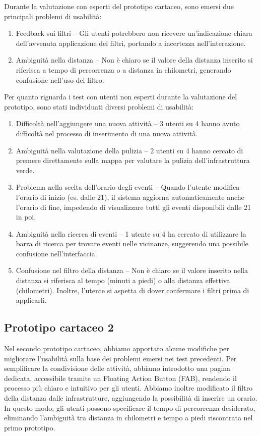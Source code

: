 Durante la valutazione con esperti del prototipo cartaceo, sono emersi due principali problemi di usabilità:
\begin{enumerate}
    \item Feedback sui filtri – Gli utenti potrebbero non ricevere un’indicazione chiara dell'avvenuta applicazione dei filtri, portando a incertezza nell’interazione.
    \item Ambiguità nella distanza – Non è chiaro se il valore della distanza inserito si riferisca a tempo di percorrenza o a distanza in chilometri, generando confusione nell’uso del filtro.
\end{enumerate}
Per quanto riguarda i test con utenti non esperti durante la valutazione del prototipo, sono stati individuati diversi problemi di usabilità:
\begin{enumerate}
    \item Difficoltà nell’aggiungere una nuova attività – 3 utenti su 4 hanno avuto difficoltà nel processo di inserimento di una nuova attività.
    \item Ambiguità nella valutazione della pulizia – 2 utenti su 4 hanno cercato di premere direttamente sulla mappa per valutare la pulizia dell’infrastruttura verde.
    \item Problema nella scelta dell’orario degli eventi – Quando l’utente modifica l’orario di inizio (es. dalle 21), il sistema aggiorna automaticamente anche l’orario di fine, impedendo di visualizzare tutti gli eventi disponibili dalle 21 in poi.
    \item Ambiguità nella ricerca di eventi – 1 utente su 4 ha cercato di utilizzare la barra di ricerca per trovare eventi nelle vicinanze, suggerendo una possibile confusione nell’interfaccia.
    \item Confusione nel filtro della distanza – Non è chiaro se il valore inserito nella distanza si riferisca al tempo (minuti a piedi) o alla distanza effettiva (chilometri). Inoltre, l’utente si aspetta di dover confermare i filtri prima di applicarli.
\end{enumerate}

\subsection{Prototipo cartaceo 2}
Nel secondo prototipo cartaceo, abbiamo apportato alcune modifiche per migliorare l'usabilità sulla base dei problemi emersi nei test precedenti. Per semplificare la condivisione delle attività, abbiamo introdotto una pagina dedicata, accessibile tramite un Floating Action Button (FAB), rendendo il processo più chiaro e intuitivo per gli utenti.
Abbiamo inoltre modificato il filtro della distanza dalle infrastrutture, aggiungendo la possibilità di inserire un orario. In questo modo, gli utenti possono specificare il tempo di percorrenza desiderato, eliminando l’ambiguità tra distanza in chilometri e tempo a piedi riscontrata nel primo prototipo.

